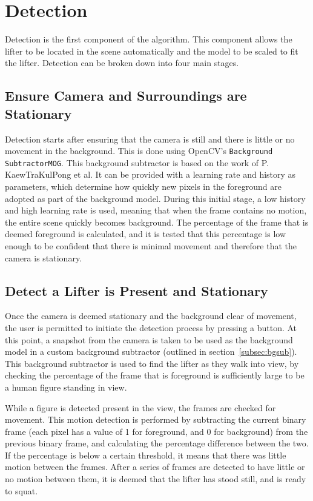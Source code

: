 \section{Detection}

Detection is the first component of the algorithm. This component allows the lifter to be located in the scene automatically and the model to be scaled to fit the lifter. Detection can be broken down into four main stages.

\subsection{Ensure Camera and Surroundings are Stationary}
Detection starts after ensuring that the camera is still and there is little or no movement in the background. This is done using OpenCV's \texttt{Background SubtractorMOG}. This background subtractor is based on the work of P. KaewTraKulPong et al\cite{backgroundsubmog}. It can be provided with a learning rate and history as parameters, which determine how quickly new pixels in the foreground are adopted as part of the background model. During this initial stage, a low history and high learning rate is used, meaning that when the frame contains no motion, the entire scene quickly becomes background. The percentage of the frame that is deemed foreground is calculated, and it is tested that this percentage is low enough to be confident that there is minimal movement and therefore that the camera is stationary.

\subsection{Detect a Lifter is Present and Stationary}
Once the camera is deemed stationary and the background clear of movement, the user is permitted to initiate the detection process by pressing a button. At this point, a snapshot from the camera is taken to be used as the background model in a custom background subtractor (outlined in section~\ref{subsec:bgsub}). This background subtractor is used to find the lifter as they walk into view, by checking the percentage of the frame that is foreground is sufficiently large to be a human figure standing in view. 

While a figure is detected present in the view, the frames are checked for movement. This motion detection is performed by subtracting the current binary frame (each pixel has a value of 1 for foreground, and 0 for background) from the previous binary frame, and calculating the percentage difference between the two. If the percentage is below a certain threshold, it means that there was little motion between the frames. After a series of frames are detected to have little or no motion between them, it is deemed that the lifter has stood still, and is ready to squat.

